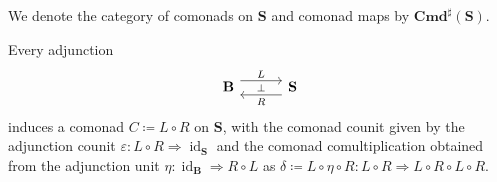 \documentclass[11pt, oneside, article]{memoir}
\theoremstyle{plain}
\theoremstyle{definition}
\theoremstyle{remark}
\newenvironment{remark}
{\renewcommand\qedsymbol{$\lrcorner$}%
  \pushQED{\qed}\myremark}
{\popQED\endmyremark}
\DeclareMathOperator{\id}{id}
\newcommand{\namedcat}[1]{\mathbf{#1}}
\newcommand{\cat}[1]{\mathbf{#1}}
\newcommand{\Com}{\namedcat{Cmd}^\sharp}
\newcommand{\cmnd}[1]{{#1}}
\newcommand{\cC}{\cmnd{C}}
\newcommand{\bB}{\cat{B}}
\newcommand{\bS}{\cat{S}}
\begin{document}

We denote the category of comonads on $\bS$ and comonad maps by
$\Com(\bS)$.

\begin{remark}
  Every adjunction
  \[
    \begin{tikzcd}[column sep=30pt]
      \bB\ar[r, shift left=5pt, "L"]\ar["\bot"{anchor=center},r, draw=none]&
      \bS\ar[l, shift left=5pt, "R"]
    \end{tikzcd}
  \]
  induces a comonad $\cC \coloneqq L \circ R$ on $\bS$, with the comonad
  counit given by the adjunction counit
  $\varepsilon \colon L \circ R \Rightarrow \id_{\bS}$ and the comonad
  comultiplication obtained from the adjunction unit
  $\eta \colon \id_{\bB} \Rightarrow R \circ L$ as
  $\delta \coloneqq L \circ \eta \circ R \colon L \circ R \Rightarrow L \circ R \circ L
  \circ R$.
\end{remark}
\end{document}
